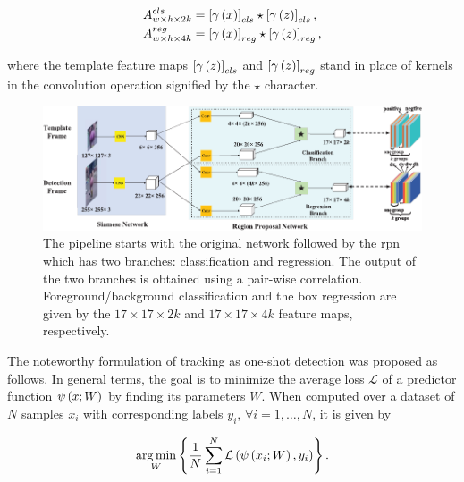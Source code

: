 \begin{equation}
    \begin{aligned}
        {A}_{w \times h \times 2k}^{cls} &=
        \left[ {{\gamma} \left( x \right)} \right]_{cls} \star \left[ {{\gamma} \left( z \right)} \right]_{cls},\\
        {A}_{w \times h \times 4k}^{reg} &=
        \left[ {{\gamma} \left( x \right)} \right]_{reg} \star \left[ {{\gamma} \left( z \right)} \right]_{reg},
    \end{aligned}
\end{equation}

\noindent where the template feature maps $\left[ {{\gamma} \left( z \right)} \right]_{cls}$ and $\left[ {{\gamma} \left( z \right)} \right]_{reg}$ stand in place of kernels in the convolution operation signified by the $\star$ character.

\begin{figure}[t]
    \centerline{\includegraphics[width=\linewidth]{figures/theoretical_foundations/siam_rpn_architecture.pdf}}
    \caption[ architecture]{The pipeline starts with the original  network followed by the \gls{rpn} which has two branches: classification and regression. The output of the two branches is obtained using a pair-wise correlation. Foreground/background classification and the box regression are given by the $17 \times 17 \times 2k$ and $17 \times 17 \times 4k$ feature maps, respectively. }
    \label{fig:SiamRPNNetArchitecture}
\end{figure}

The noteworthy formulation of tracking as one-shot detection was proposed as follows. In general terms, the goal is to minimize the average loss $\mathcal{L}$ of a predictor function ${\psi} \left( x; W \right)$ by finding its parameters $W$. When computed over a dataset of $N$ samples $x_i$ with corresponding labels $y_i$, $\forall i = 1, \dots, N$, it is given by

\begin{equation}
    \label{eq:SiamRPNOneShotGeneral}
    \underset{W}{\operatorname*{arg\,min}}
    \left\{ {
        \frac{1}{N}
        \sum_{i = 1}^{N}
        {\mathcal{L}} \left( 
            {\psi} \left( x_i; W \right),
            y_i
         \right)
    } \right\}.
\end{equation}

